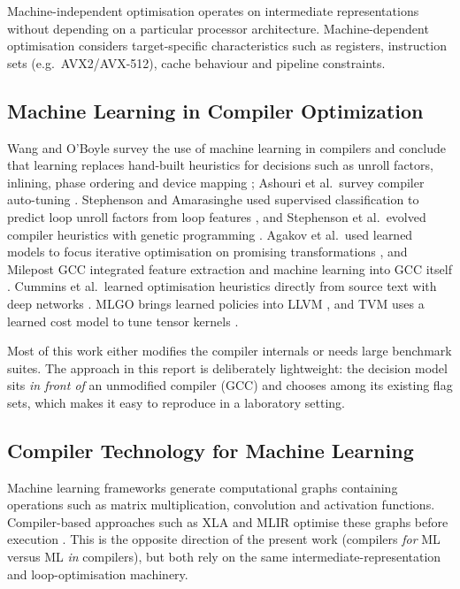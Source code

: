 \documentclass[12pt,a4paper]{article}
\begin{document}
Machine-independent optimisation operates on intermediate representations
without depending on a particular processor architecture. Machine-dependent
optimisation considers target-specific characteristics such as registers,
instruction sets (e.g.\ AVX2/AVX-512), cache behaviour and pipeline constraints.

\subsection{Machine Learning in Compiler Optimization}

Wang and O'Boyle survey the use of machine learning in compilers and conclude that
learning replaces hand-built heuristics for decisions such as unroll factors,
inlining, phase ordering and device mapping \cite{wang2018}; Ashouri et al.\ survey
compiler auto-tuning \cite{ashouri2018}. Stephenson and Amarasinghe used supervised
classification to predict loop unroll factors from loop features
\cite{stephenson2005}, and Stephenson et al.\ evolved compiler heuristics with
genetic programming \cite{stephenson2003}. Agakov et al.\ used learned models to
focus iterative optimisation on promising transformations \cite{agakov2006}, and
Milepost GCC integrated feature extraction and machine learning into GCC itself
\cite{fursin2011}. Cummins et al.\ learned optimisation heuristics directly from
source text with deep networks \cite{cummins2017}. MLGO brings
learned policies into LLVM \cite{trofin2021}, and TVM uses a learned cost model
to tune tensor kernels \cite{chen2018}.

Most of this work either modifies the compiler internals or needs large benchmark suites. The approach in
this report is deliberately lightweight: the decision model sits \emph{in front of}
an unmodified compiler (GCC) and chooses among its existing flag sets, which makes it
easy to reproduce in a laboratory setting.

\subsection{Compiler Technology for Machine Learning}

Machine learning frameworks generate computational graphs containing
operations such as matrix multiplication, convolution and activation functions.
Compiler-based approaches such as XLA and MLIR optimise these graphs before
execution \cite{abadi2016,lattner2021}. This is the opposite direction of the
present work (compilers \emph{for} ML versus ML \emph{in} compilers), but both
rely on the same intermediate-representation and loop-optimisation machinery.
\end{document}
